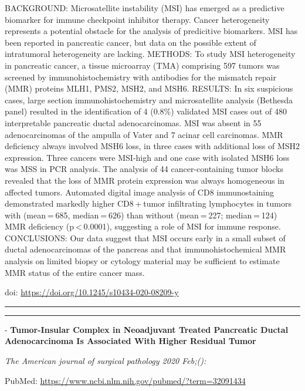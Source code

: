 \documentclass[
]{article}
\begin{document}
BACKGROUND: Microsatellite instability (MSI) has emerged as a predictive
biomarker for immune checkpoint inhibitor therapy. Cancer heterogeneity
represents a potential obstacle for the analysis of predicitive
biomarkers. MSI has been reported in pancreatic cancer, but data on the
possible extent of intratumoral heterogeneity are lacking. METHODS: To
study MSI heterogeneity in pancreatic cancer, a tissue microarray (TMA)
comprising 597 tumors was screened by immunohistochemistry with
antibodies for the mismatch repair (MMR) proteins MLH1, PMS2, MSH2, and
MSH6. RESULTS: In six suspicious cases, large section
immunohistochemistry and microsatellite analysis (Bethesda panel)
resulted in the identification of 4 (0.8\%) validated MSI cases out of
480 interpretable pancreatic ductal adenocarcinomas. MSI was absent in
55 adenocarcinomas of the ampulla of Vater and 7 acinar cell carcinomas.
MMR deficiency always involved MSH6 loss, in three cases with additional
loss of MSH2 expression. Three cancers were MSI-high and one case with
isolated MSH6 loss was MSS in PCR analysis. The analysis of 44
cancer-containing tumor blocks revealed that the loss of MMR protein
expression was always homogeneous in affected tumors. Automated digital
image analysis of CD8 immunostaining demonstrated markedly higher
CD8 + tumor infiltrating lymphocytes in tumors with (mean = 685,
median = 626) than without (mean = 227; median = 124) MMR deficiency
(p \textless{} 0.0001), suggesting a role of MSI for immune response.
CONCLUSIONS: Our data suggest that MSI occurs early in a small subset of
ductal adenocarcinomas of the pancreas and that immunohistochemical MMR
analysis on limited biopsy or cytology material may be sufficient to
estimate MMR status of the entire cancer mass.

doi: \url{https://doi.org/10.1245/s10434-020-08209-y}

\begin{center}\rule{0.5\linewidth}{0.5pt}\end{center}

\begin{center}\rule{0.5\linewidth}{0.5pt}\end{center}

- \textbf{Tumor-Insular Complex in Neoadjuvant Treated Pancreatic Ductal
Adenocarcinoma Is Associated With Higher Residual Tumor}

\emph{The American journal of surgical pathology 2020 Feb;():}

PubMed: \url{https://www.ncbi.nlm.nih.gov/pubmed/?term=32091434}
\end{document}
